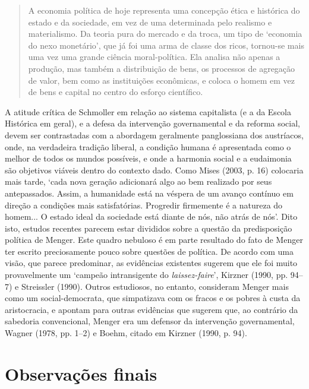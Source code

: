 \documentclass[12pt]{article}
\begin{document}
\begin{quote}
A economia política de hoje representa uma concepção ética e histórica do estado e da sociedade, em vez de uma determinada pelo realismo e materialismo. Da teoria pura do mercado e da troca, um tipo de ‘economia do nexo monetário’, que já foi uma arma de classe dos ricos, tornou-se mais uma vez uma grande ciência moral-política. Ela analisa não apenas a produção, mas também a distribuição de bens, os processos de agregação de valor, bem como as instituições econômicas, e coloca o homem em vez de bens e capital no centro do esforço científico.
\end{quote}

A atitude crítica de Schmoller em relação ao sistema capitalista (e a da Escola Histórica em geral), e a defesa da intervenção governamental e da reforma social, devem ser contrastadas com a abordagem geralmente panglossiana dos austríacos, onde, na verdadeira tradição liberal, a condição humana é apresentada como o melhor de todos os mundos possíveis, e onde a harmonia social e a eudaimonia são objetivos viáveis dentro do contexto dado. Como Mises (2003, p. 16) colocaria mais tarde, ‘cada nova geração adicionará algo ao bem realizado por seus antepassados. Assim, a humanidade está na véspera de um avanço contínuo em direção a condições mais satisfatórias. Progredir firmemente é a natureza do homem... O estado ideal da sociedade está diante de nós, não atrás de nós’. Dito isto, estudos recentes parecem estar divididos sobre a questão da predisposição política de Menger. Este quadro nebuloso é em parte resultado do fato de Menger ter escrito preciosamente pouco sobre questões de política. De acordo com uma visão, que parece predominar, as evidências existentes sugerem que ele foi muito provavelmente um ‘campeão intransigente do \textit{laissez-faire}’, Kirzner (1990, pp. 94–7) e Streissler (1990). Outros estudiosos, no entanto, consideram Menger mais como um social-democrata, que simpatizava com os fracos e os pobres à custa da aristocracia, e apontam para outras evidências que sugerem que, ao contrário da sabedoria convencional, Menger era um defensor da intervenção governamental, Wagner (1978, pp. 1–2) e Boehm, citado em Kirzner (1990, p. 94).

\section{Observações finais}
\end{document}
